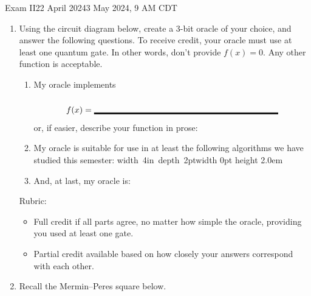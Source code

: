 \documentclass[12pt]{article}
\newcommand{\Blank}[1][1in]{\mbox{\vrule width #1 depth 2pt}\vrule width 0pt height 2.0em}
\begin{document}
\begin{assignment}{Exam II}{22 April 2024}{3 May 2024, 9 AM CDT}
\begin{enumerate}
\clearpage\item{}
Using the circuit diagram below, create a 3-bit oracle of your choice, and answer the following questions.  To receive credit, your oracle must use at least one quantum gate.  In other words, don't provide $f(x)=0$. Any other function is acceptable.

\begin{enumerate}
    \item My oracle implements \[f(x)=\Blank[3in]{}\]
    or, if easier, describe your function in prose:
    \LeaveSpace{1.5in}
    \item My oracle is suitable for use in at least the following algorithms we have studied this semester: \Blank[4in]{}
    \item And, at last, my oracle is:
    
    \bigskip
    \begin{center}
\end{center}
\end{enumerate}
Rubric:
\begin{itemize}
    \item Full credit if all parts agree, no matter how simple the oracle, providing you used at least one gate.
    \item Partial credit available based on how closely your answers correspond with each other.
\end{itemize}

\clearpage\item{} Recall the Mermin--Peres square below.


\end{enumerate}
\end{assignment}
\end{document}
